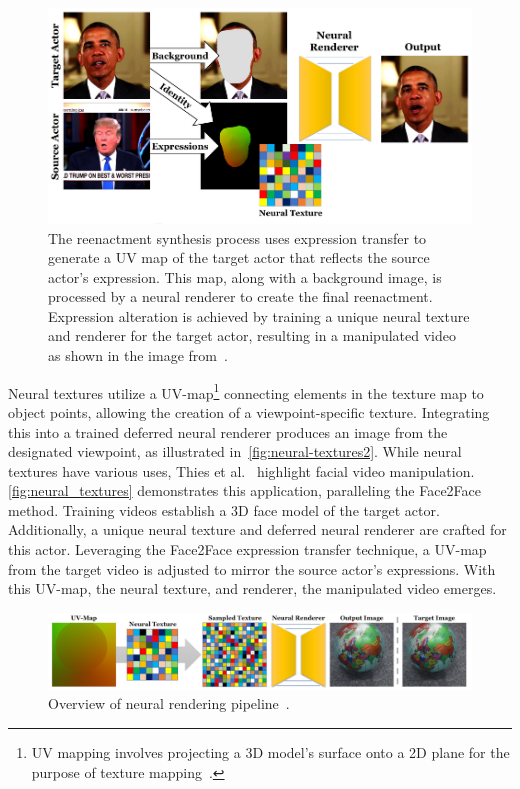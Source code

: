 \begin{figure}[htpb]
	\centering
	\includegraphics[scale=0.55]{figures/neural_textures}
	\caption{The reenactment synthesis process uses expression transfer
		to generate a UV map of the target actor that reflects the source
		actor's expression. This map, along with a background image, is
		processed by a neural renderer to create the final reenactment.
		Expression alteration is achieved by training a unique neural
		texture and renderer for the target actor, resulting in a
		manipulated video as shown in the image from~\cite{thies2019deferred}.}\label{fig:neural_textures}
\end{figure}

Neural textures utilize a UV-map\footnote{UV mapping involves projecting a 3D model's surface
	onto a 2D plane for the purpose of texture mapping~\cite{enwiki:1169139226}.}
connecting elements in the texture map to object points, allowing the creation of a
viewpoint-specific texture. Integrating this into a trained deferred neural renderer
produces an image from the designated viewpoint, as illustrated in~\autoref{fig:neural-textures2}.
While neural textures have various uses, Thies et al.~\cite{thies2019deferred} highlight
facial video manipulation. \autoref{fig:neural_textures} demonstrates this application,
paralleling the Face2Face~\cite{thies2020face2face} method. Training videos establish a
3D face model of the target actor. Additionally, a unique neural texture and deferred neural
renderer are crafted for this actor. Leveraging the Face2Face expression transfer
technique, a UV-map from the target video is adjusted to mirror the source actor's
expressions. With this UV-map, the neural texture, and renderer, the manipulated video emerges.

\begin{figure}[htpb]
	\centering
	\includegraphics[scale=0.25]{figures/neural_textures2}
	\caption{Overview of neural rendering pipeline~\cite{thies2019deferred}.}\label{fig:neural-textures2}
\end{figure}


